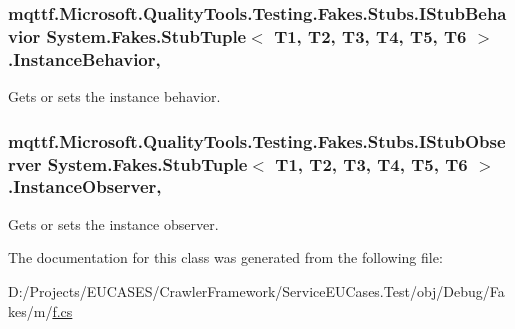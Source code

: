 \hypertarget{class_system_1_1_fakes_1_1_stub_tuple_3_01_t1_00_01_t2_00_01_t3_00_01_t4_00_01_t5_00_01_t6_01_4_a82afcfa312cbc7ebeda81bba8985371a}{
\subsubsection[{Instance\-Behavior}]{\setlength{\rightskip}{0pt plus 5cm}mqttf.\-Microsoft.\-Quality\-Tools.\-Testing.\-Fakes.\-Stubs.\-I\-Stub\-Behavior System.\-Fakes.\-Stub\-Tuple$<$ T1, T2, T3, T4, T5, T6 $>$.Instance\-Behavior\hspace{0.3cm}{\ttfamily [get]}, {\ttfamily [set]}}}\label{class_system_1_1_fakes_1_1_stub_tuple_3_01_t1_00_01_t2_00_01_t3_00_01_t4_00_01_t5_00_01_t6_01_4_a82afcfa312cbc7ebeda81bba8985371a}


Gets or sets the instance behavior.

\hypertarget{class_system_1_1_fakes_1_1_stub_tuple_3_01_t1_00_01_t2_00_01_t3_00_01_t4_00_01_t5_00_01_t6_01_4_ad3e3a656b287cfb4877723c5065157c0}{
\subsubsection[{Instance\-Observer}]{\setlength{\rightskip}{0pt plus 5cm}mqttf.\-Microsoft.\-Quality\-Tools.\-Testing.\-Fakes.\-Stubs.\-I\-Stub\-Observer System.\-Fakes.\-Stub\-Tuple$<$ T1, T2, T3, T4, T5, T6 $>$.Instance\-Observer\hspace{0.3cm}{\ttfamily [get]}, {\ttfamily [set]}}}\label{class_system_1_1_fakes_1_1_stub_tuple_3_01_t1_00_01_t2_00_01_t3_00_01_t4_00_01_t5_00_01_t6_01_4_ad3e3a656b287cfb4877723c5065157c0}


Gets or sets the instance observer.



The documentation for this class was generated from the following file\-:\begin{DoxyCompactItemize}
\item 
D\-:/\-Projects/\-E\-U\-C\-A\-S\-E\-S/\-Crawler\-Framework/\-Service\-E\-U\-Cases.\-Test/obj/\-Debug/\-Fakes/m/\hyperlink{m_2f_8cs}{f.\-cs}\end{DoxyCompactItemize}

